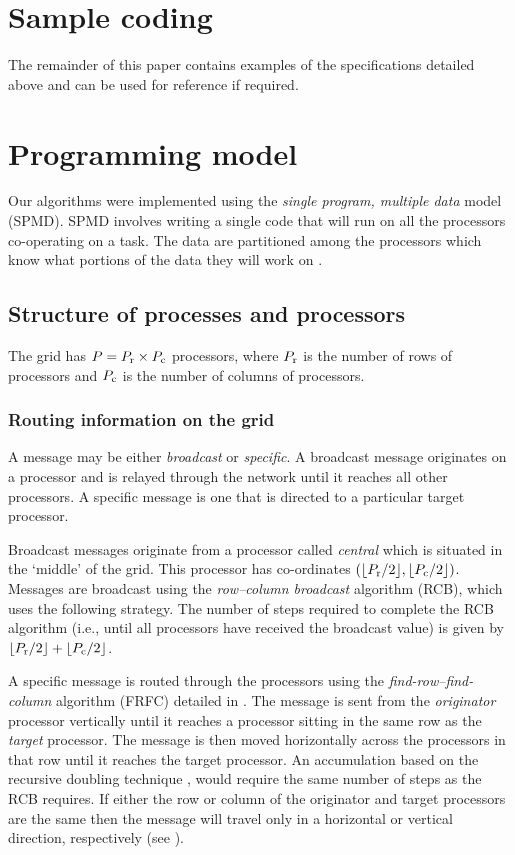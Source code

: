 \documentclass{ecai}
\begin{document}
\section{Sample coding}
The remainder of this paper contains examples of the specifications
detailed above and can be used for reference if required.

\section{Programming model}
\label{par}
Our algorithms were implemented using the \emph{single program,
  multiple data} model (SPMD). SPMD involves writing a single code
that will run on all the processors co-operating on a task. The data
are partitioned among the processors which know what portions of the
data they will work on \cite{kn:Golub89}.

\subsection{Structure of processes and processors}
\label{procstruct}
The grid has $P=P_{\rm{r}}\times P_{\rm{c}}$ processors, where
$P_{\rm{r}}$ is the number of rows of processors and $P_{\rm{c}}$ is
the number of columns of processors.

\subsubsection{Routing information on the grid}
\label{routing} A message may be either \emph{broadcast} or {\em
  specific}. A broadcast message originates on a processor and is
relayed through the network until it reaches all other processors. A
specific message is one that is directed to a particular target
processor.

Broadcast messages originate from a processor called \emph{central}
which is situated in the `middle' of the grid. This processor has
co-ordinates $(\lfloor P_{\rm{r}}/2 \rfloor,\lfloor P_{\rm{c}}/2
\rfloor)$.  Messages are broadcast using the \emph{row--column
  broadcast} algorithm (RCB), which uses the following strategy.  The
number of steps required to complete the RCB algorithm (i.e., until
all processors have received the broadcast value) is given by $\lfloor
P_{\rm{r}}/2\rfloor+\lfloor P_{\rm{c}}/2\rfloor$.

A specific message is routed through the processors using the
\emph{find-row--find-column} algorithm (FRFC) detailed in
\cite{kn:deCarlini91}.  The message is sent from the \emph{originator}
processor vertically until it reaches a processor sitting in the same
row as the \emph{target} processor. The message is then moved
horizontally across the processors in that row until it reaches the
target processor. An accumulation based on the recursive doubling
technique \cite[pp. 56--61]{kn:Modi88}, would require the same number
of steps as the RCB requires. If either the row or column of the
originator and target processors are the same then the message will
travel only in a horizontal or vertical direction, respectively (see
\cite{kn:Smith85}).
\end{document}
